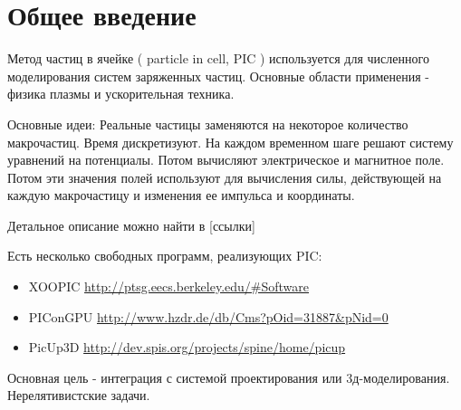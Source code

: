 \section{Общее введение}
Метод частиц в ячейке ( particle in cell, PIC ) используется для 
численного моделирования систем заряженных частиц. 
Основные области применения - физика плазмы и ускорительная техника.

Основные идеи:
Реальные частицы заменяются на некоторое количество макрочастиц.
Время дискретизуют.
На каждом временном шаге решают систему уравнений на потенциалы. 
Потом вычисляют электрическое и магнитное поле.
Потом эти значения полей используют для вычисления силы, действующей на каждую макрочастицу и изменения ее импульса и координаты. 

Детальное описание можно найти в [ссылки]

Есть несколько свободных программ, реализующих PIC:

\begin{itemize}
\item XOOPIC \url{http://ptsg.eecs.berkeley.edu/#Software}
\item PIConGPU \url{http://www.hzdr.de/db/Cms?pOid=31887&pNid=0}
\item PicUp3D \url{http://dev.spis.org/projects/spine/home/picup}
\end{itemize}

Основная цель - интеграция с системой проектирования или 3д-моделирования.
Нерелятивистские задачи.



